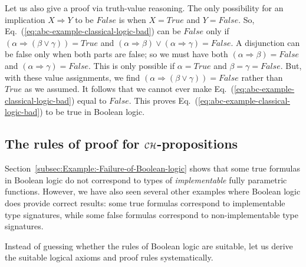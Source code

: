 Let us also give a proof via truth-value reasoning. The only possibility
for an implication $X\Rightarrow Y$ to be $False$ is when $X=True$
and $Y=False$. So, Eq.~(\ref{eq:abc-example-classical-logic-bad})
can be $False$ only if $\left(\alpha\Rightarrow(\beta\vee\gamma)\right)=True$
and $\left(\alpha\Rightarrow\beta\right)\vee\left(\alpha\Rightarrow\gamma\right)=False$.
A disjunction can be false only when both parts are false; so we must
have both $\left(\alpha\Rightarrow\beta\right)=False$ and $\left(\alpha\Rightarrow\gamma\right)=False$.
This is only possible if $\alpha=True$ and $\beta=\gamma=False$.
But, with these value assignments, we find $\left(\alpha\Rightarrow(\beta\vee\gamma)\right)=False$
rather than $True$ as we assumed. It follows that we cannot ever
make Eq.~(\ref{eq:abc-example-classical-logic-bad}) equal to $False$.
This proves Eq.~(\ref{eq:abc-example-classical-logic-bad}) to be
true in Boolean logic.

\subsection{The rules of proof for ${\cal CH}$-propositions\label{subsec:The-rules-of-proof}}

Section~\ref{subsec:Example:-Failure-of-Boolean-logic} shows that
some true formulas in Boolean logic do not correspond to types of
\emph{implementable} fully parametric functions. However, we have
also seen several other examples where Boolean logic does provide
correct results: some true formulas correspond to implementable type
signatures, while some false formulas correspond to non-implementable
type signatures.

Instead of guessing whether the rules of Boolean logic are suitable,
let us derive the suitable logical axioms and proof rules systematically.

